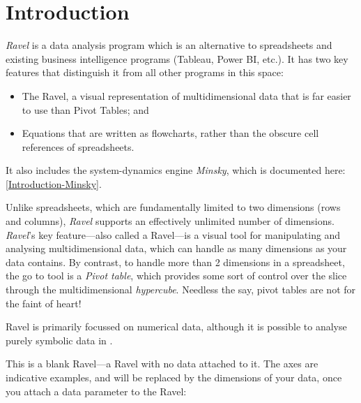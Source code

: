 
\chapter{Introduction}

\label{Introduction}\emph{Ravel} is a data analysis program which
is an alternative to spreadsheets and existing business intelligence
programs (Tableau, Power BI, etc.). It has two key features that distinguish
it from all other programs in this space: 
\begin{itemize}
\item The Ravel, a visual representation of multidimensional data that is
far easier to use than Pivot Tables; and
\item Equations that are written as flowcharts, rather than the obscure
cell references of spreadsheets.
\end{itemize}
It also includes the system-dynamics engine \emph{Minsky}, which is
documented here: \ref{Introduction-Minsky}.

Unlike spreadsheets, which are fundamentally limited to two dimensions
(rows and columns), \emph{Ravel} supports an effectively unlimited
number of dimensions. \emph{Ravel}'s key feature---also called a
Ravel---is a visual tool for manipulating and analysing multidimensional
data, which can handle as many dimensions as your data contains. By
contrast, to handle more than 2 dimensions in a spreadsheet, the go to
tool is a {\em Pivot table}, which provides some sort of control over
the slice through the multidimensional {\em hypercube}. Needless the
say, pivot tables are not for the faint of heart!

Ravel is primarily focussed on numerical data, although it is possible
to analyse purely symbolic data in .

This is a blank Ravel---a Ravel with no data attached to it. The
axes are indicative examples, and will be replaced by the dimensions
of your data, once you attach a data parameter to the Ravel:


